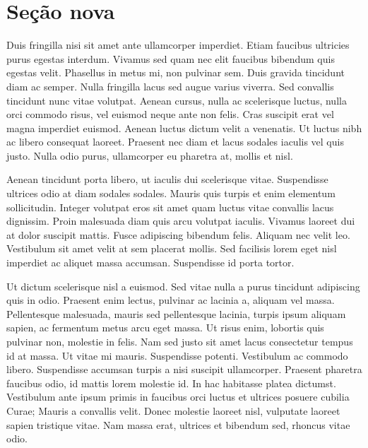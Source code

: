 \section{Se\c{c}\~ao nova}

Duis fringilla nisi sit amet ante ullamcorper imperdiet. Etiam faucibus ultricies purus egestas interdum. Vivamus sed quam nec elit faucibus bibendum quis egestas velit. Phasellus in metus mi, non pulvinar sem. Duis gravida tincidunt diam ac semper. Nulla fringilla lacus sed augue varius viverra. Sed convallis tincidunt nunc vitae volutpat. Aenean cursus, nulla ac scelerisque luctus, nulla orci commodo risus, vel euismod neque ante non felis. Cras suscipit erat vel magna imperdiet euismod. Aenean luctus dictum velit a venenatis. Ut luctus nibh ac libero consequat laoreet. Praesent nec diam et lacus sodales iaculis vel quis justo. Nulla odio purus, ullamcorper eu pharetra at, mollis et nisl.

Aenean tincidunt porta libero, ut iaculis dui scelerisque vitae. Suspendisse ultrices odio at diam sodales sodales. Mauris quis turpis et enim elementum sollicitudin. Integer volutpat eros sit amet quam luctus vitae convallis lacus dignissim. Proin malesuada diam quis arcu volutpat iaculis. Vivamus laoreet dui at dolor suscipit mattis. Fusce adipiscing bibendum felis. Aliquam nec velit leo. Vestibulum sit amet velit at sem placerat mollis. Sed facilisis lorem eget nisl imperdiet ac aliquet massa accumsan. Suspendisse id porta tortor.

Ut dictum scelerisque nisl a euismod. Sed vitae nulla a purus tincidunt adipiscing quis in odio. Praesent enim lectus, pulvinar ac lacinia a, aliquam vel massa. Pellentesque malesuada, mauris sed pellentesque lacinia, turpis ipsum aliquam sapien, ac fermentum metus arcu eget massa. Ut risus enim, lobortis quis pulvinar non, molestie in felis. Nam sed justo sit amet lacus consectetur tempus id at massa. Ut vitae mi mauris. Suspendisse potenti. Vestibulum ac commodo libero. Suspendisse accumsan turpis a nisi suscipit ullamcorper. Praesent pharetra faucibus odio, id mattis lorem molestie id. In hac habitasse platea dictumst. Vestibulum ante ipsum primis in faucibus orci luctus et ultrices posuere cubilia Curae; Mauris a convallis velit. Donec molestie laoreet nisl, vulputate laoreet sapien tristique vitae. Nam massa erat, ultrices et bibendum sed, rhoncus vitae odio.

